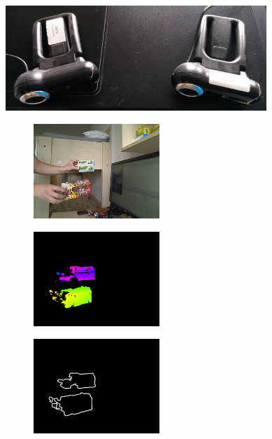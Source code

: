 \begin{figure}[b!]
\centering
\includegraphics[width=280pt]{figures/scene2_camerapose.jpg}
\caption{Kamerák helyzete a második jelenetnél \label{fig:scene2_camerapose}}
\vspace{15pt}
\begin{subfigure}[b]{.32\linewidth}
	\centering
	\includegraphics[width=135pt]{figures/scene2/left_45.png}
  \end{subfigure}
\begin{subfigure}[b]{.32\linewidth}
	\centering
	\includegraphics[width=135pt]{figures/scene2/vis_45.png}
  \end{subfigure}
\begin{subfigure}[b]{.32\linewidth}
	\centering
	\includegraphics[width=135pt]{figures/scene2/ctr_45.png}
  \end{subfigure}\\\vspace{5pt}
  \begin{subfigure}[b]{.32\linewidth}

\end{subfigure}
\end{figure}
